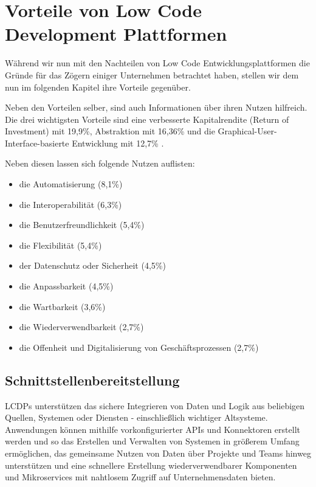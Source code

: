 \documentclass[12pt]{article} %
\begin{document}
	\section{Vorteile von Low Code Development Plattformen}
	Während wir nun mit den Nachteilen von Low Code Entwicklungsplattformen die Gründe für das Zögern einiger Unternehmen betrachtet haben, stellen wir dem nun im folgenden Kapitel ihre Vorteile gegenüber.\newline
	
	Neben den Vorteilen selber, sind auch Informationen über ihren Nutzen hilfreich. Die drei wichtigsten Vorteile sind eine verbesserte Kapitalrendite (Return of Investment) mit 19,9\%, Abstraktion mit 16,36\% und die Graphical-User-Interface-basierte Entwicklung mit 12,7\% \autocite{Bucaioni.2022}. 
	
	Neben diesen lassen sich folgende Nutzen auflisten: 
	\begin{itemize}
		\item die Automatisierung (8,1\%)
		\item die Interoperabilität (6,3\%)
		\item die Benutzerfreundlichkeit (5,4\%) 
		\item die Flexibilität (5,4\%) 
		\item der Datenschutz oder Sicherheit (4,5\%)
		\item die Anpassbarkeit (4,5\%)
		\item die Wartbarkeit (3,6\%)
		\item die Wiederverwendbarkeit (2,7\%)
		\item die Offenheit und Digitalisierung von Geschäftsprozessen (2,7\%)
	\end{itemize}
		\autocite{Bucaioni.2022} 
	
	\subsection{Schnittstellenbereitstellung} 
	LCDPs unterstützen das sichere Integrieren von Daten und Logik aus beliebigen Quellen, Systemen oder Diensten - einschließlich wichtiger Altsysteme. Anwendungen können mithilfe vorkonfigurierter APIs und Konnektoren erstellt werden und so das Erstellen und Verwalten von Systemen in größerem Umfang ermöglichen, das gemeinsame Nutzen von Daten über Projekte und Teams hinweg unterstützen und eine schnellere Erstellung wiederverwendbarer Komponenten und Mikroservices mit nahtlosem Zugriff auf Unternehmensdaten bieten. \autocite{Mendix.2023}
	
\end{document}
